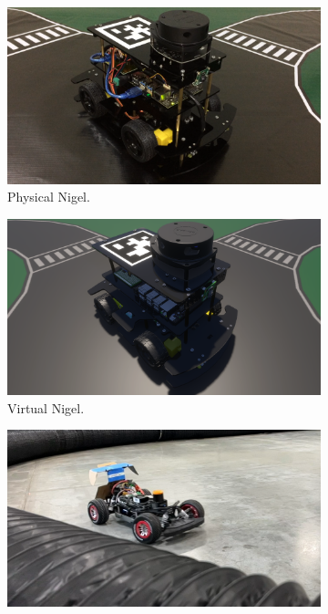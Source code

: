\documentclass[letterpaper, 10 pt, conference]{ieeeconf}  %
\begin{document}
\begin{figure}[t]
     \centering
     \begin{subfigure}[b]{0.245\linewidth}
         \centering
         \includegraphics[width=\linewidth]{Fig2a.png}
         \caption{Physical Nigel.}
         \label{fig2a}
     \end{subfigure}
     \hfill
     \begin{subfigure}[b]{0.245\linewidth}
         \centering
         \includegraphics[width=\linewidth]{Fig2b.png}
         \caption{Virtual Nigel.}
         \label{fig2b}
     \end{subfigure}
     \begin{subfigure}[b]{0.245\linewidth}
         \centering
         \includegraphics[width=\linewidth]{Fig2c.png}

\end{subfigure}
\end{figure}
\end{document}
